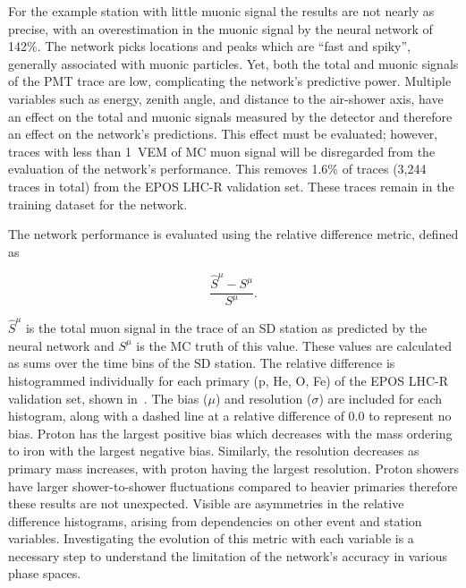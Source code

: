 For the example station with little muonic signal the results are not nearly as precise, with an overestimation in the muonic signal by the neural network of 142\%.
The network picks locations and peaks which are ``fast and spiky'', generally associated with muonic particles.
Yet, both the total and muonic signals of the PMT trace are low, complicating the network's predictive power.
Multiple variables such as energy, zenith angle, and distance to the air-shower axis, have an effect on the total and muonic signals measured by the detector and therefore an effect on the network's predictions.
This effect must be evaluated; however, traces with less than \qty{1}{VEM} of MC muon signal will be disregarded from the evaluation of the network's performance.
This removes 1.6\% of traces (3,244 traces in total) from the EPOS LHC-R validation set.
These traces remain in the training dataset for the network.



The network performance is evaluated using the relative difference metric, defined as

\begin{equation}
    \frac{\hat{S}^{\mu} - S^{\mu}}{S^{\mu}}. \label{eq:metric}
\end{equation}

\noindent
$\hat{S}^{\mu}$ is the total muon signal in the trace of an SD station as predicted by the neural network and $S^{\mu}$ is the MC truth of this value.
These values are calculated as sums over the time bins of the SD station.
The relative difference is histogrammed individually for each primary (p, He, O, Fe) of the EPOS LHC-R validation set, shown in~.
The bias ($\mu$) and resolution ($\sigma$) are included for each histogram, along with a dashed line at a relative difference of 0.0 to represent no bias.
Proton has the largest positive bias which decreases with the mass ordering to iron with the largest negative bias.
Similarly, the resolution decreases as primary mass increases, with proton having the largest resolution.
Proton showers have larger shower-to-shower fluctuations compared to heavier primaries therefore these results are not unexpected.
Visible are asymmetries in the relative difference histograms, arising from dependencies on other event and station variables.
Investigating the evolution of this metric with each variable is a necessary step to understand the limitation of the network's accuracy in various phase spaces.

